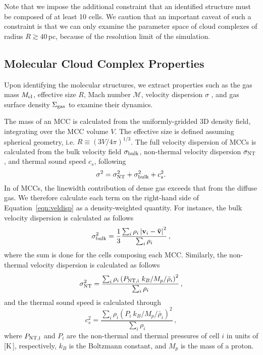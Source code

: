 \IfFileExists{emulateapjlegacy.cls}{\documentclass[iop]{emulateapjlegacy}}{\documentclass[iop]{emulateapj}}
\begin{document}
Note that we impose the additional constraint that an identified
structure must be composed of at least 10 cells. We caution that an
important caveat of such a constraint is that we can only examine the
parameter space of cloud complexes of 
radius $R\gtrsim 40$\,pc,
because of the resolution limit of the simulation.

\subsection{Molecular Cloud Complex Properties} \label{sec:distribution}

Upon identifying the molecular structures, we extract properties such
as the gas mass $M_{\rm cl}$, effective size $R$, Mach number
$\mathcal{M}$, velocity dispersion $\sigma$
, and gas surface density $\Sigma_{\rm gas}$ to examine their dynamics.

The mass of an MCC is calculated from the uniformly-gridded 3D density field, integrating over the MCC volume $V$. The effective size is defined assuming spherical geometry, i.e. $R \equiv (3 V /4 \pi)^{1/3}$.
The full velocity dispersion of MCCs is calculated from 
the bulk velocity field $\sigma_{\rm bulk}$, non-thermal velocity dispersion $\sigma_{\rm NT}$, and thermal sound speed $c_s$, following
\begin{equation}
\sigma^2 = \sigma_{\rm NT}^2 + \sigma_{\rm bulk}^2 + c_s^2.
\label{eqn:veldisp}
\end{equation}
%
In \obs of MCCs, the linewidth contribution of dense gas 
exceeds that from the diffuse gas. We therefore calculate each term on
the right-hand side of Equation~\ref{eqn:veldisp} as a density-weighted quantity. 
For instance, the bulk velocity dispersion is calculated as follows
\begin{equation}
\sigma_{\rm bulk}^2 = \frac{1}{{3}}\frac{\sum_{i} \rho_i \left|\mathbf{v}_i - \mathbf{\bar v}\right|^2}{\sum_i \rho_i}\,,
\end{equation}
where the sum is done for the cells composing each MCC.
Similarly, the non-thermal velocity dispersion is calculated as follows
\begin{equation}
\sigma_{\rm NT}^2 = \frac{\sum_{i} \rho_i \left(P_{\rm NT, i}~k_B / M_p / {\bar \rho_i} \right)^2}{\sum_i \rho_i}\,,
\end{equation}
and the thermal sound speed is calculated through
\begin{equation}
c_s^2 = \frac{\sum_{i} \rho_i \left(P_i~k_B / M_p / {\bar \rho_i} \right)^2}{\sum_i \rho_i}\,,   %
\end{equation}
where $P_{\rm NT, i}$ and $P_i$ are the non-thermal and thermal pressures of cell $i$ in units of [K\,\cc], respectively, $k_B$ is the Boltzmann constant, and 
$M_p$ is the mass of a proton. 
\end{document}
